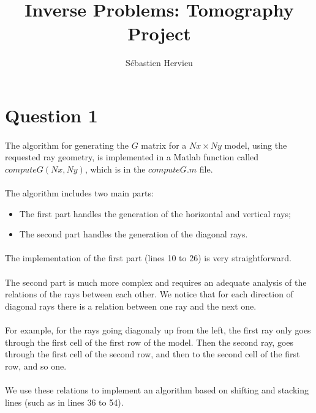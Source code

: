 \documentclass[12pt,a4paper]{extreport}
\author{Sébastien Hervieu}
\title{ Inverse Problems: Tomography Project}
\begin{document}
\maketitle
\section{Question 1}
\paragraph*{}
The algorithm for generating the $G$ matrix for a $Nx \times Ny$ model, using the requested ray geometry, is implemented in a Matlab function called $computeG(Nx,Ny)$, which is in the $computeG.m$ file.

\paragraph*{}
The algorithm includes two main parts:
\begin{itemize}
\item The first part handles the generation of the horizontal and vertical rays;
\item The second part handles the generation of the diagonal rays.
\end{itemize}

\paragraph*{}
The implementation of the first part (lines 10 to 26) is very straightforward.

\paragraph*{}
The second part is much more complex and requires an adequate analysis of the relations of the rays between each other. We notice that for each direction of diagonal rays there is a relation between one ray and the next one.

\paragraph*{}
For example, for the rays going diagonaly up from the left, the first ray only goes through the first cell of the first row of the model. Then the second ray, goes through the first cell of the second row, and then to the second cell of the first row, and so one.

\paragraph*{}
We use these relations to implement an algorithm based on shifting and stacking lines (such as in lines 36 to 54).
\end{document}
